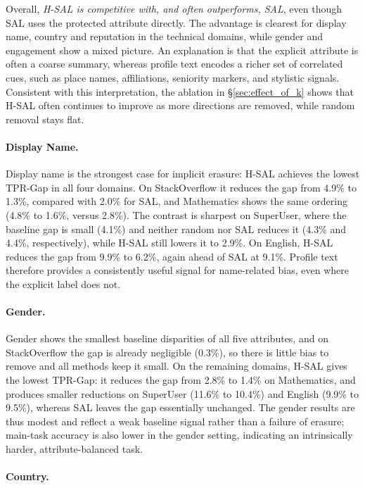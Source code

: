 \documentclass[11pt]{article}
\begin{document}
Overall, \emph{H-SAL is competitive with, and often outperforms, SAL}, even though SAL uses the protected attribute directly. The advantage is clearest for display name, country and reputation in the technical domains, while gender and engagement show a mixed picture. An explanation is that the explicit attribute is often a coarse summary, whereas profile text encodes a richer set of correlated cues, such as place names, affiliations, seniority markers, and stylistic signals. Consistent with this interpretation, the ablation in \S\ref{sec:effect_of_k} shows that H-SAL often continues to improve as more directions are removed, while random removal stays flat.



\paragraph{Display Name.}

Display name is the strongest case for implicit erasure: H-SAL achieves the lowest TPR-Gap in all four domains. On StackOverflow it reduces the gap from 4.9\% to 1.3\%, compared with 2.0\% for SAL, and Mathematics shows the same ordering (4.8\% to 1.6\%, versus 2.8\%). The contrast is sharpest on SuperUser, where the baseline gap is small (4.1\%) and neither random nor SAL reduces it (4.3\% and 4.4\%, respectively), while H-SAL still lowers it to 2.9\%. On English, H-SAL reduces the gap from 9.9\% to 6.2\%, again ahead of SAL at 9.1\%. Profile text therefore provides a consistently useful signal for name-related bias, even where the explicit label does not.

\paragraph{Gender.}
Gender shows the smallest baseline disparities of all five attributes, and on StackOverflow the gap is already negligible (0.3\%), so there is little bias to remove and all methods keep it small. On the remaining domains, H-SAL gives the lowest TPR-Gap: it reduces the gap from 2.8\% to 1.4\% on Mathematics, and produces smaller reductions on SuperUser (11.6\% to 10.4\%) and English (9.9\% to 9.5\%), whereas SAL leaves the gap essentially unchanged. The gender results are thus modest and reflect a weak baseline signal rather than a failure of erasure; main-task accuracy is also lower in the gender setting, indicating an intrinsically harder, attribute-balanced task.


\paragraph{Country.}
\end{document}
